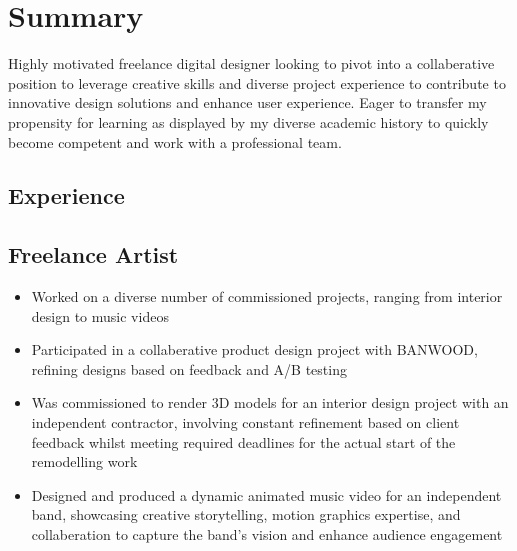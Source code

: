 \documentclass{article}
\begin{document}
\section{Summary}
Highly motivated freelance digital designer looking to pivot into a collaberative position to leverage creative skills and diverse project experience to contribute to innovative design solutions and enhance user experience. Eager to transfer my propensity for learning as displayed by my diverse academic history to quickly become competent and work with a professional team.
\begin{paracol}{2}
  \raggedright
  \vspace{3pt}
  \section{Experience}
  \subsection{Freelance Artist}
  {\color{TitleGrey}{\scriptsize\faCalendar}\hspace{5pt}{\small09/2023 -- Present}}
  
  \begin{itemize}[leftmargin=*]
    \setlength\itemsep{-2pt}
    \item Worked on a diverse number of commissioned projects, ranging from interior design to music videos
    \item Participated in a collaberative product design project with BANWOOD, refining designs based on feedback and A/B testing
    \item Was commissioned to render 3D models for an interior design project with an independent contractor, involving constant refinement based on client feedback whilst meeting required deadlines for the actual start of the remodelling work
    \item Designed and produced a dynamic animated music video for an independent band, showcasing creative storytelling, motion graphics expertise, and collaberation to capture the band's vision and enhance audience engagement
  \end{itemize}


\end{paracol}
\end{document}
